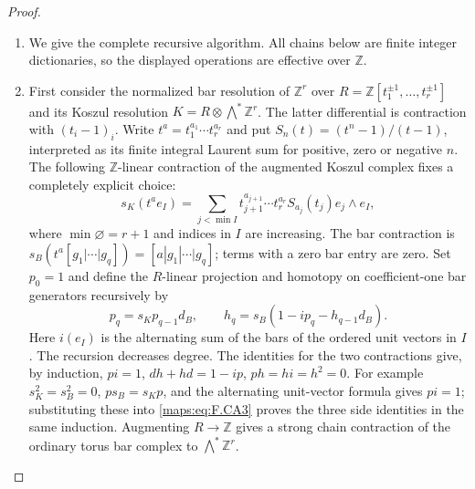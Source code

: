 \begin{proof}
\begin{enumerate}[label=\arabic*.]
\item We give the complete recursive algorithm.  All chains below are
finite integer dictionaries, so the displayed operations are
effective over $\mathbb Z$.

\item First consider the normalized bar resolution of $\mathbb Z^r$
over $R=\mathbb Z[t_1^{\pm1},\ldots,t_r^{\pm1}]$ and its Koszul
resolution $K=R\otimes\bigwedge^*\mathbb Z^r$.
The latter differential is contraction with $(t_i-1)_i$.
Write $t^a=t_1^{a_1}\cdots t_r^{a_r}$ and put
$S_n(t)=(t^n-1)/(t-1)$, interpreted as its finite integral
Laurent sum for positive, zero or negative $n$.
The following $\mathbb Z$-linear contraction of the augmented
Koszul complex fixes a completely explicit choice:
\[
 s_K(t^a e_I)=
 \sum_{j<\min I}
 t_{j+1}^{a_{j+1}}\cdots t_r^{a_r}S_{a_j}(t_j)
 e_j\wedge e_I,                                           \tag{F.CA2}\label{maps:eq:F.CA2}
\]
where $\min\varnothing=r+1$ and indices in $I$ are increasing.
The bar contraction is
$s_B(t^a[g_1|\cdots|g_q])=[a|g_1|\cdots|g_q]$; terms with a
zero bar entry are zero.  Set $p_0=1$ and define the
$R$-linear projection and homotopy on coefficient-one bar
generators recursively by
\[
 p_q=s_Kp_{q-1}d_B,
 \qquad
 h_q=s_B(1-ip_q-h_{q-1}d_B).                               \tag{F.CA3}\label{maps:eq:F.CA3}
\]
Here $i(e_I)$ is the alternating sum of the bars of the ordered
unit vectors in $I$.  The recursion decreases degree.  The
identities for the two contractions give, by induction,
$pi=1$, $dh+hd=1-ip$, $ph=hi=h^2=0$.
For example $s_K^2=s_B^2=0$, $ps_B=s_Kp$, and the alternating
unit-vector formula gives $pi=1$; substituting these into
\eqref{maps:eq:F.CA3} proves the three side identities in the same induction.
Augmenting $R\to\mathbb Z$ gives a strong chain contraction
of the ordinary torus bar complex to $\bigwedge^*\mathbb Z^r$.


\end{enumerate}
\end{proof}
